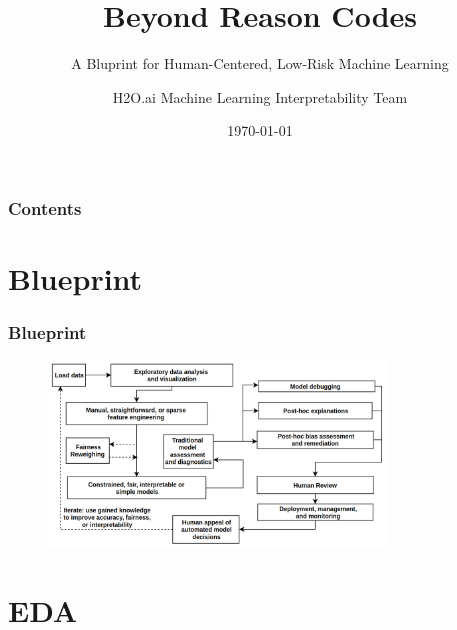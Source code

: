 \documentclass[11pt,
               aspectratio=169,
               hyperref={colorlinks}
               ]{beamer}
\author{H2O.ai Machine Learning Interpretability Team}
\title{Beyond Reason Codes}
\subtitle{A Bluprint for Human-Centered, Low-Risk Machine Learning}
\institute{\href{https://www.h2o.ai}{H\textsubscript{2}O.ai}}
\date{\today}
\begin{document}
	
	\maketitle
	
	\begin{frame}
	
		\frametitle{Contents}
		
		\tableofcontents{}
		
	\end{frame}

	\section{Blueprint}
	
		\begin{frame}
		
			\frametitle{Blueprint}
				
			\begin{figure}[htb]
				\begin{center}
					\includegraphics[height=140pt]{img/blueprint.png}
					\label{fig:blueprint}
				\end{center}
			\end{figure}		
		
		\end{frame}


	\section{EDA}
	
\end{document}
